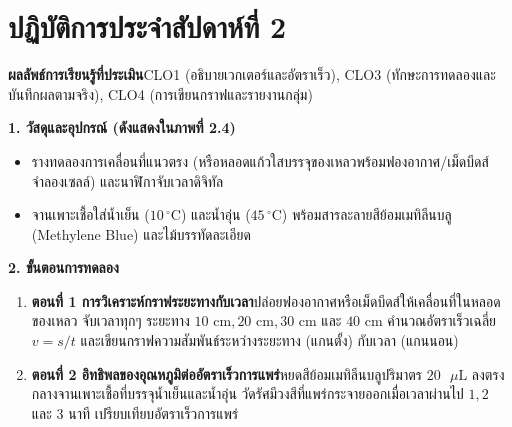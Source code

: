\section{ปฏิบัติการประจำสัปดาห์ที่ 2}


\begin{labbox}
\noindent\textbf{ผลลัพธ์การเรียนรู้ที่ประเมิน}\quad CLO1 (อธิบายเวกเตอร์และอัตราเร็ว), CLO3 (ทักษะการทดลองและบันทึกผลตามจริง), CLO4 (การเขียนกราฟและรายงานกลุ่ม)

\vspace{4pt}
\noindent\textbf{1. วัสดุและอุปกรณ์ (ดังแสดงใน\mbox{ภาพที่} 2.4)}
\begin{itemize}
    \item รางทดลองการเคลื่อนที่แนวตรง (หรือหลอดแก้วใสบรรจุของเหลวพร้อมฟองอากาศ/เม็ดบีดส์จำลองเซลล์) และนาฬิกาจับเวลาดิจิทัล
    \item จานเพาะเชื้อใส่น้ำเย็น ($10\,^\circ\text{C}$) และน้ำอุ่น ($45\,^\circ\text{C}$) พร้อมสารละลายสีย้อมเมทิลีนบลู (Methylene Blue) และไม้บรรทัดละเอียด
\end{itemize}

\noindent\textbf{2. ขั้นตอนการทดลอง}
\begin{enumerate}
    \item \textbf{ตอนที่ 1 การวิเคราะห์กราฟระยะทางกับเวลา}\quad ปล่อยฟองอากาศหรือเม็ดบีดส์ให้เคลื่อนที่ในหลอดของเหลว จับเวลาทุกๆ ระยะทาง $10\text{ cm}, 20\text{ cm}, 30\text{ cm}$ และ $40\text{ cm}$ คำนวณอัตราเร็วเฉลี่ย $v = s/t$ และเขียนกราฟความสัมพันธ์ระหว่างระยะทาง (แกนตั้ง) กับเวลา (แกนนอน)
    \item \textbf{ตอนที่ 2 อิทธิพลของอุณหภูมิต่ออัตราเร็วการแพร่}\quad หยดสีย้อมเมทิลีนบลูปริมาตร $20\text{ }\mu\text{L}$ ลงตรงกลางจานเพาะเชื้อที่บรรจุน้ำเย็นและน้ำอุ่น วัดรัศมีวงสีที่แพร่กระจายออกเมื่อเวลาผ่านไป $1, 2$ และ $3$ นาที เปรียบเทียบอัตราเร็วการแพร่
\end{enumerate}


\end{labbox}

